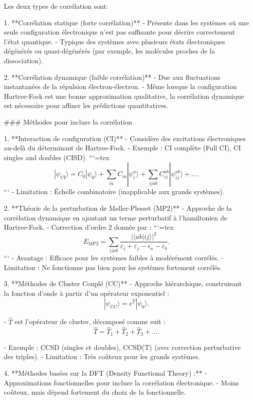 \documentclass[12pt,a4paper]{report}
\begin{document}
\begin{markdown}
 Les deux types de corrélation sont:

1. **Corrélation statique (forte corrélation)**
   - Présente dans les systèmes où une seule configuration électronique n’est pas suffisante pour décrire correctement l’état quantique.
   - Typique des systèmes avec plusieurs états électroniques dégénérés ou quasi-dégénérés (par exemple, les molécules proches de la dissociation).

2. **Corrélation dynamique (faible corrélation)**
   - Due aux fluctuations instantanées de la répulsion électron-électron.
   - Même lorsque la configuration Hartree-Fock est une bonne approximation qualitative, la corrélation dynamique est nécessaire pour affiner les prédictions quantitatives.

### Méthodes pour inclure la corrélation

1. **Interaction de configuration (CI)**
   - Considère des excitations électroniques au-delà du déterminant de Hartree-Fock.
   - Exemple : CI complète (Full CI), CI singles and doubles (CISD).
```{=tex}
\[
|\psi_{\text{CI}}\rangle = C_0 |\psi_0\rangle + \sum_{ia} C_{ia} |\psi_i^a\rangle + \sum_{ijab} C_{ij}^{ab} |\psi_{ij}^{ab}\rangle + \dots .
\]
```
   - Limitation : Échelle combinatoire (inapplicable aux grands systèmes).

2. **Théorie de la perturbation de Møller-Plesset (MP2)**
   - Approche de la corrélation dynamique en ajoutant un terme perturbatif à l'hamiltonien de Hartree-Fock.
   - Correction d'ordre 2 donnée par :
```{=tex}
\[
E_{\text{MP2}} = \sum_{ijab} \frac{|\langle ab | ij \rangle|^2}{\varepsilon_i + \varepsilon_j - \epsilon_a - \varepsilon_b} .
\]
```
   - Avantage : Efficace pour les systèmes faibles à modérément corrélés.
   - Limitation : Ne fonctionne pas bien pour les systèmes fortement corrélés.

3. **Méthodes de Cluster Couplé (CC)**
   - Approche hiérarchique, construisant la fonction d’onde à partir d’un opérateur exponentiel :
\[
|\psi_{\text{CC}}\rangle = e^{\hat{T}} |\psi_0\rangle .
\]

   - \(\hat{T}\) est l’opérateur de cluster, décomposé comme suit :
\[
\hat{T} = \hat{T}_1 + \hat{T}_2 + \hat{T}_3 + \dots .
\]

   - Exemple : CCSD (singles et doubles), CCSD(T) (avec correction perturbative des triples).
   - Limitation : Très coûteux pour les grands systèmes.

4. **Méthodes basées sur la DFT (Density Functional Theory) :**
   - Approximations fonctionnelles pour inclure la corrélation électronique.
   - Moins coûteux, mais dépend fortement du choix de la fonctionnelle.


\end{markdown}
\end{document}
